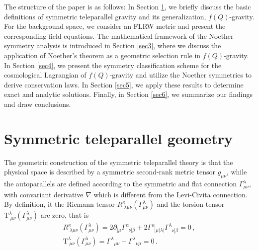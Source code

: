 \documentclass[onecolumn,superscriptaddress,secnumarabic,nobibnotes,aps,prd,nofootinbib,altaffilletter,11pt]{revtex4}
\begin{document}
The structure of the paper is as follows: In Section \ref{sec2}, we briefly discuss the basic definitions of symmetric
teleparallel gravity and its generalization, $f\left(Q\right)$-gravity. For
the background space, we consider an FLRW metric and present the
corresponding field equations. The mathematical framework of the Noether
symmetry analysis is introduced in Section \ref{sec3}, where we discuss the
application of Noether's theorem as a geometric selection rule in $%
f\left(Q\right)$-gravity. In Section \ref{sec4}, we present the symmetry classification scheme for the
cosmological Lagrangian of $f\left(Q\right)$-gravity and utilize the Noether
symmetries to derive conservation laws. In Section \ref{sec5}, we apply
these results to determine exact and analytic solutions. Finally, in Section %
\ref{sec6}, we summarize our findings and draw conclusions.

\section{Symmetric teleparallel geometry}

\label{sec2}

The geometric construction of the symmetric teleparallel theory is that the
physical space is described by a symmetric second-rank metric tensor $g_{\mu
\nu }$, while the autoparallels are defined according to the symmetric and
flat connection $\Gamma _{\mu \nu }^{\lambda }$, with convariant derivative $%
\nabla $ which is different from the Levi-Civita connection. By definition,
it the Riemann tensor $R_{\;\lambda \mu \nu }^{\kappa }\left( \Gamma _{\mu
\nu }^{\lambda }\right) $ and the torsion tensor $\mathrm{T}_{\;\mu \nu
}^{\lambda }\left( \Gamma _{\mu \nu }^{\lambda }\right) $ are zero, that is 
\cite{revh}%
\begin{gather}
R_{\;\lambda \mu \nu }^{\kappa }\left( \Gamma _{\mu \nu }^{\lambda }\right)  = 2\partial_{[\mu}\Gamma^{\alpha}_{\;\;\nu]\beta}+2\Gamma^{\alpha}_{\;\;[\mu|\lambda|}\Gamma^{\lambda}_{\;\;\nu]\beta} = 0\,,  \label{fq.01} \\
\mathrm{T}_{\;\mu \nu }^{\lambda }\left( \Gamma _{\mu \nu }^{\lambda }\right)  = \Gamma ^\lambda {}_{\mu\nu} - \Gamma^\lambda {}_{\nu\mu} = 0\,.  \label{fq.02}
\end{gather}
\end{document}
